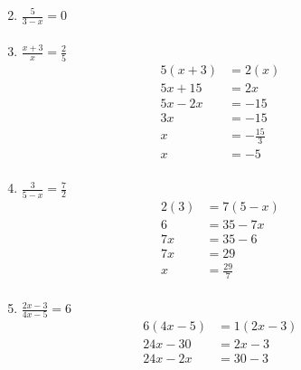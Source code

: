 \documentclass{article}
\begin{document}
\begin{description}
\begin{enumerate}
\begin{equation}
                  \end{equation}
            \item $\frac{5}{3-x} = 0$
                  \begin{equation}
                      \begin{split}
                      \end{split}
                  \end{equation}
            \item $\frac{x+3}{x} = \frac{2}{5}$
                  \begin{equation}
                      \begin{split}
                          5(x+3) & = 2(x)\\
                          5x+15 & = 2x \\
                          5x-2x & = -15 \\
                          3x & = -15 \\
                          x & = -\frac{15}{3}\\
                          x & = -5 \\
                      \end{split}
                  \end{equation}
            \item $\frac{3}{5-x} = \frac{7}{2}$
                  \begin{equation}
                      \begin{split}
                          2(3) & = 7(5-x)\\
                          6 & = 35-7x\\
                          7x & = 35 - 6 \\
                          7x & = 29 \\
                          x & = \frac{29}{7}\\
                      \end{split}
                  \end{equation}
            \item $\frac{2x-3}{4x-5} = 6$
                  \begin{equation}
                      \begin{split}
                          6(4x-5) & = 1(2x-3)\\
                          24x-30 & = 2x-3\\
                          24x-2x & = 30-3\\

\end{split}
\end{equation}
\end{enumerate}
\end{description}
\end{document}
